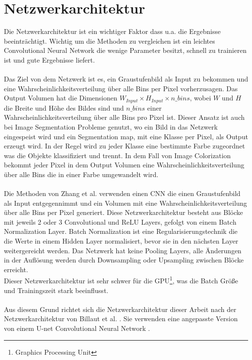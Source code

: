 \section{Netzwerkarchitektur}
Die Netzwerkarchitektur ist ein wichtiger Faktor dass u.a. die Ergebnisse beeinträchtigt. Wichtig um die Methoden zu vergleichen ist ein
leichtes Convolutional Neural Network die wenige Parameter besitzt, schnell zu trainieren ist und gute Ergebnisse liefert. 
\\
\\
Das Ziel von dem Netzwerk ist es, ein Graustufenbild als Input zu bekommen und eine Wahrscheinlichkeitsverteilung über alle Bins per Pixel vorherzusagen.
Das Output Volumen hat die Dimensionen $ W_{Input} \times H_{Input} \times n\_bins $, wobei $W$ und $H$ die Breite und Höhe des Bildes sind und
$n\_bins$ einer Wahrscheinlichkeitsverteilung über alle Bins pro Pixel ist. Dieser Ansatz ist auch bei Image Segmentation Probleme genutzt, wo ein Bild
in das Netzwerk eingespeist wird und ein Segmentation map, mit eine Klasse per Pixel, als Output erzeugt wird. In der Regel wird zu jeder Klasse eine
bestimmte Farbe zugeordnet was die Objekte klassifiziert und trennt. In dem Fall von Image Colorization bekommt jeder Pixel in dem Output Volumen
eine Wahrscheinlichkeitsverteilung über alle Bins die in einer Farbe umgewandelt wird.
\\
\\
Die Methoden von Zhang et al. \cite{zhang2016colorful} verwenden einen \gls{CNN} die einen Graustufenbild als Input entgegennimmt und ein Volumen mit
eine Wahrscheinlichkeitsverteilung über alle Bins per Pixel generiert. Diese Netzwerkarchitektur besteht aus Blöcke mit jeweils 2 oder 3 Convolutional
und ReLU Layers, gefolgt von einem Batch Normalization Layer. Batch Normalization ist eine Regularisierungstechnik die die Werte in einem Hidden Layer
normalisiert, bevor sie in den nächsten Layer weitergereicht werden. Das Netzwerk hat keine Pooling Layers, alle Änderungen in der Auflösung werden durch
Downsampling oder Upsampling zwischen Blöcke erreicht.
\\
Dieser Netzwerkarchitektur ist sehr schwer für die GPU\footnote{Graphics Processing Unit}, was die Batch Größe und Trainingszeit stark beeinflusst.
\\
\\
Aus diesem Grund richtet sich die Netzwerkarchitektur dieser Arbeit nach der Netzwerkarchitektur von Billaut et al. \cite{billaut2018colorunet}. 
Sie verwenden eine angepasste Version von einem U-net Convolutional Neural Network \cite{ronneberger2015unet}. 

